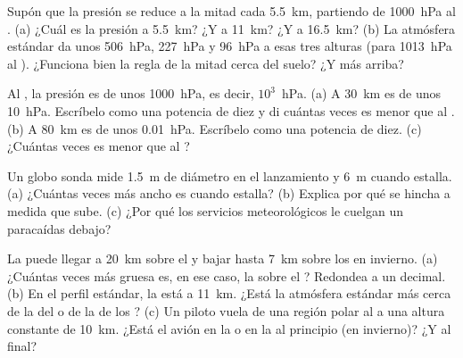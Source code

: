 \begin{exercise}[$\star\star$]\label{exo:g8:the-atmosphere:7}
Supón que la presión se reduce a la mitad cada \qty{5.5}{km}, partiendo de
\qty{1000}{hPa} al . (a) ¿Cuál es la presión a
\qty{5.5}{km}? ¿Y a \qty{11}{km}? ¿Y a \qty{16.5}{km}? (b) La atmósfera
estándar da unos \qty{506}{hPa}, \qty{227}{hPa} y \qty{96}{hPa} a esas tres
alturas (para \qty{1013}{hPa} al ). ¿Funciona bien la regla de
la mitad cerca del suelo? ¿Y más arriba?
\end{exercise}

\begin{exercise}[$\star\star$]\label{exo:g8:the-atmosphere:8}
Al , la presión es de unos \qty{1000}{hPa}, es decir,
$10^3$~hPa. (a) A \qty{30}{km} es de unos \qty{10}{hPa}. Escríbelo como
una potencia de diez y di cuántas veces es menor que al .
(b) A \qty{80}{km} es de unos \qty{0.01}{hPa}. Escríbelo como una potencia
de diez. (c) ¿Cuántas veces es menor que al ?
\end{exercise}

\begin{exercise}[$\star\star$]\label{exo:g8:the-atmosphere:9}
Un globo sonda mide \qty{1.5}{m} de diámetro en el lanzamiento y \qty{6}{m}
cuando estalla. (a) ¿Cuántas veces más ancho es cuando estalla? (b) Explica
por qué se hincha a medida que sube. (c) ¿Por qué los servicios
meteorológicos le cuelgan un paracaídas debajo?
\end{exercise}

\begin{exercise}[$\star\star$]\label{exo:g8:the-atmosphere:10}
La  puede llegar a \qty{20}{km} sobre el  y bajar hasta
\qty{7}{km} sobre los  en invierno. (a) ¿Cuántas veces más gruesa es,
en ese caso, la  sobre el ? Redondea a un decimal. (b) En
el perfil estándar, la  está a \qty{11}{km}. ¿Está la atmósfera
estándar más cerca de la del  o de la de los ? (c) Un piloto
vuela de una región polar al  a una altura constante de
\qty{10}{km}. ¿Está el avión en la  o en la  al
principio (en invierno)? ¿Y al final?
\end{exercise}

